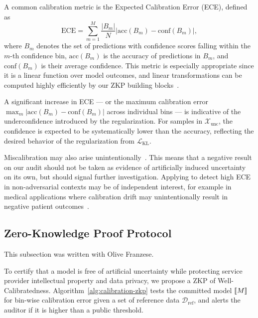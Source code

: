 A common calibration metric is the Expected Calibration Error (ECE), defined as
\begin{equation}
    \text{ECE} = \sum_{m=1}^M \frac{|B_m|}{N} \left| \text{acc}(B_m) - \text{conf}(B_m) \right|,
\end{equation}
where \(B_m\) denotes the set of predictions with confidence scores falling within the \(m\)-th confidence bin, \(\text{acc}(B_m)\) is the accuracy of predictions in \(B_m\), and \(\text{conf}(B_m)\) is their average confidence. This metric is especially appropriate since it is a linear function over model outcomes, and linear transformations can be computed highly efficiently by our ZKP building blocks~\cite{weng2021wolverine}.

A significant increase in ECE --- or the maximum calibration error $\max_{m}\left| \text{acc}(B_m) - \text{conf}(B_m) \right|$ across individual bins --- is indicative of the underconfidence introduced by the regularization. For samples in \(\mathcal{X}_\text{unc}\), the confidence is expected to be systematically lower than the accuracy, reflecting the desired behavior of the regularization from \(\mathcal{L}_\text{KL}\).

Miscalibration may also arise unintentionally~\cite{niculescu2005predicting}. This means that a negative result on our audit should not be taken as evidence of artificially induced uncertainty on its own, but should signal further investigation. Applying \name to detect high ECE in non-adversarial contexts may be of independent interest, for example in medical applications where calibration drift may unintentionally result in negative patient outcomes~\cite{kore2024drift}.




\subsection{Zero-Knowledge Proof Protocol}

\begin{contriback}
This subsection was written with Olive Franzese.
\end{contriback}

To certify that a model is free of artificial uncertainty while protecting service provider intellectual property and data privacy, we propose a ZKP of Well-Calibratedness. Algorithm~\ref{alg:calibration-zkp} tests the committed model $\llbracket M \rrbracket$ for bin-wise calibration error given a set of reference data $\mathcal{D}_{\text{ref}}$, and alerts the auditor if it is higher than a public threshold. %

